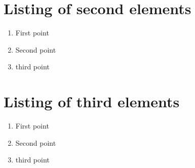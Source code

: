 \documentclass[12pt]{report}
\begin{document}
\section{Listing of second elements}
	\begin{enumerate}
		\item First point
		\item Second point
		\item third point
	\end{enumerate}

	\section{Listing of third elements}
	\begin{enumerate}[label=\Alph *]
		\item First point
		\item Second point
		\item third point
	\end{enumerate}
\end{document}
